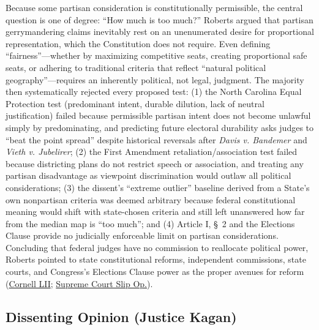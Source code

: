 \documentclass[12pt]{article}
\begin{document}
Because some partisan consideration is constitutionally permissible, the central question is one of degree: ``How much is too much?'' Roberts argued that partisan gerrymandering claims inevitably rest on an unenumerated desire for proportional representation, which the Constitution does not require. Even defining ``fairness''---whether by maximizing competitive seats, creating proportional safe seats, or adhering to traditional criteria that reflect ``natural political geography''---requires an inherently political, not legal, judgment. The majority then systematically rejected every proposed test: (1) the North Carolina Equal Protection test (predominant intent, durable dilution, lack of neutral justification) failed because permissible partisan intent does not become unlawful simply by predominating, and predicting future electoral durability asks judges to ``beat the point spread'' despite historical reversals after \textit{Davis v. Bandemer} and \textit{Vieth v. Jubelirer}; (2) the First Amendment retaliation/association test failed because districting plans do not restrict speech or association, and treating any partisan disadvantage as viewpoint discrimination would outlaw all political considerations; (3) the dissent's ``extreme outlier'' baseline derived from a State's own nonpartisan criteria was deemed arbitrary because federal constitutional meaning would shift with state-chosen criteria and still left unanswered how far from the median map is ``too much''; and (4) Article I, \S~2 and the Elections Clause provide no judicially enforceable limit on partisan considerations. Concluding that federal judges have no commission to reallocate political power, Roberts pointed to state constitutional reforms, independent commissions, state courts, and Congress's Elections Clause power as the proper avenues for reform (\href{https://www.law.cornell.edu/supremecourt/text/18-422}{Cornell LII}; \href{https://www.supremecourt.gov/opinions/18pdf/18-422_9ol1.pdf}{Supreme Court Slip Op.}).

\subsection{Dissenting Opinion (Justice Kagan)}
\end{document}
